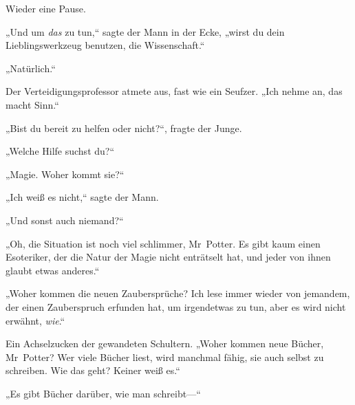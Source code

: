 Wieder eine Pause.

„Und um \emph{das} zu tun,“ sagte der Mann in der Ecke, „wirst du dein Lieblingswerkzeug benutzen, die Wissenschaft.“

„Natürlich.“

Der Verteidigungsprofessor atmete aus, fast wie ein Seufzer.
„Ich nehme an, das macht Sinn.“

„Bist du bereit zu helfen oder nicht?“, fragte der Junge.

„Welche Hilfe suchst du?“

„Magie. Woher kommt sie?“

„Ich weiß es nicht,“ sagte der Mann.

„Und sonst auch niemand?“

„Oh, die Situation ist noch viel schlimmer, Mr~Potter. Es gibt kaum einen Esoteriker, der die Natur der Magie nicht enträtselt hat, und jeder von ihnen glaubt etwas anderes.“

„Woher kommen die neuen Zaubersprüche? Ich lese immer wieder von jemandem, der einen Zauberspruch erfunden hat, um irgendetwas zu tun, aber es wird nicht erwähnt, \emph{wie}.“

Ein Achselzucken der gewandeten Schultern.
„Woher kommen neue Bücher, Mr~Potter? Wer viele Bücher liest, wird manchmal fähig, sie auch selbst zu schreiben. Wie das geht? Keiner weiß es.“

„Es gibt Bücher darüber, wie man schreibt—“


